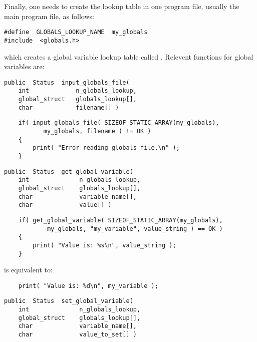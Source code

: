 Finally, one needs to create the lookup table in one program file,
usually the main program file, as follows:
{\bf\begin{verbatim}
#define  GLOBALS_LOOKUP_NAME  my_globals
#include  <globals.h>
\end{verbatim}}
which creates a global variable lookup table called
.  Relevent functions for global variables are:


{\bf\begin{verbatim}
public  Status  input_globals_file(
    int             n_globals_lookup,
    global_struct   globals_lookup[],
    char            filename[] )
\end{verbatim}}

{\bf\begin{verbatim}
    if( input_globals_file( SIZEOF_STATIC_ARRAY(my_globals),
           my_globals, filename ) != OK )
    {
        print( "Error reading globals file.\n" );
    }
\end{verbatim}}

{\bf\begin{verbatim}
public  Status  get_global_variable(
    int              n_globals_lookup,
    global_struct    globals_lookup[],
    char             variable_name[],
    char             value[] )
\end{verbatim}}

{\bf\begin{verbatim}
    if( get_global_variable( SIZEOF_STATIC_ARRAY(my_globals),
            my_globals, "my_variable", value_string ) == OK )
    {
        print( "Value is: %s\n", value_string );
    }
\end{verbatim}}
is equivalent to:
{\bf\begin{verbatim}
    print( "Value is: %d\n", my_variable );
\end{verbatim}}

{\bf\begin{verbatim}
public  Status  set_global_variable(
    int              n_globals_lookup,
    global_struct    globals_lookup[],
    char             variable_name[],
    char             value_to_set[] )
\end{verbatim}}

